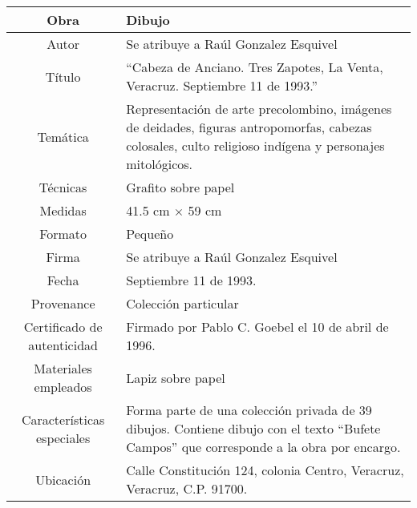 \begin{table}[H]
\centering
\begin{tabular}{|c|m{}|}
\hline
Obra& Dibujo	\\
\hline
Autor & Se atribuye a Ra\'ul Gonzalez Esquivel\\
\hline
T\'itulo & ``Cabeza de Anciano. Tres Zapotes, La Venta, Veracruz. Septiembre 11 de 1993.'' \\
\hline
Tem\'atica & Representaci\'on de arte precolombino, im\'agenes de deidades, figuras antropomorfas, cabezas colosales, culto religioso ind\'igena y personajes mitol\'ogicos.\\
\hline
T\'ecnicas &Grafito sobre papel \\
\hline
Medidas & 41.5 cm $\times$ 59 cm \\
\hline
 Formato & Peque\~no \\
 \hline
 Firma & Se atribuye a Ra\'ul Gonzalez Esquivel \\
 \hline
  Fecha & Septiembre 11 de 1993.\\
 \hline
 Provenance & Colecci\'on particular\\
 \hline
 Certificado de autenticidad& Firmado por Pablo C. Goebel el 10 de abril de 1996.  \\
 \hline 
  Materiales empleados & Lapiz sobre papel\\
 \hline
 Caracter\'isticas especiales & Forma parte de una colecci\'on privada de 39 dibujos. 
Contiene dibujo con el texto ``Bufete Campos'' que corresponde a la obra por encargo. \\
\hline 
Ubicaci\'on & Calle Constituci\'on 124, colonia Centro, Veracruz, Veracruz, C.P. 91700.\\
\hline

\end{tabular}
\end{table}

